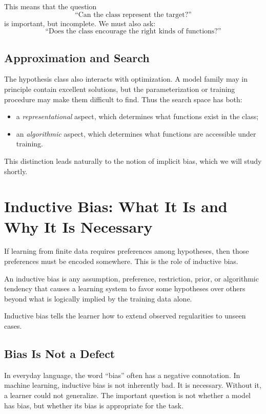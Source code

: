 This means that the question
\[
\text{``Can the class represent the target?''}
\]
is important, but incomplete. We must also ask:
\[
\text{``Does the class encourage the right kinds of functions?''}
\]

\subsection{Approximation and Search}

The hypothesis class also interacts with optimization. A model family may in principle contain excellent solutions, but the parameterization or training procedure may make them difficult to find. Thus the search space has both:
\begin{itemize}
    \item a \emph{representational} aspect, which determines what functions exist in the class;
    \item an \emph{algorithmic} aspect, which determines what functions are accessible under training.
\end{itemize}

This distinction leads naturally to the notion of implicit bias, which we will study shortly.

\section{Inductive Bias: What It Is and Why It Is Necessary}

If learning from finite data requires preferences among hypotheses, then those preferences must be encoded somewhere. This is the role of inductive bias.

\begin{definition}
An inductive bias is any assumption, preference, restriction, prior, or algorithmic tendency that causes a learning system to favor some hypotheses over others beyond what is logically implied by the training data alone.
\end{definition}

Inductive bias tells the learner how to extend observed regularities to unseen cases.

\subsection{Bias Is Not a Defect}

In everyday language, the word ``bias'' often has a negative connotation. In machine learning, inductive bias is not inherently bad. It is necessary. Without it, a learner could not generalize. The important question is not whether a model has bias, but whether its bias is appropriate for the task.

